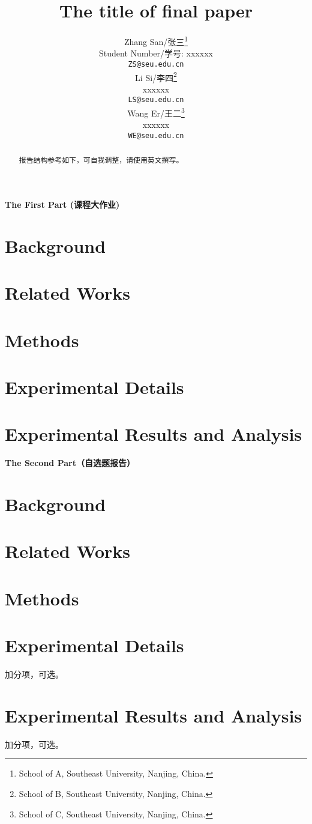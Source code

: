 \documentclass{article}
\title{The title of final paper}
\author{%
  Zhang San/张三\thanks{School of A, Southeast University, Nanjing, China.}\\
  Student Number/学号: xxxxxx \\
  \texttt{ZS@seu.edu.cn} \\
  \And
  Li Si/李四\thanks{School of B, Southeast University, Nanjing, China.} \\
  xxxxxx \\
  \texttt{LS@seu.edu.cn} \\
  \And
  Wang Er/王二\thanks{School of C, Southeast University, Nanjing, China.} \\
  xxxxxx \\
  \texttt{WE@seu.edu.cn} \\
}
\begin{document}
\maketitle

\begin{abstract}
  报告结构参考如下，可自我调整，请使用英文撰写。
\end{abstract}


\begin{center}
\Large\textbf{The First Part (课程大作业)}
\end{center}

\section{Background}

\section{Related Works}

\section{Methods}

\section{Experimental Details}

\section{Experimental Results and Analysis}

\newpage
\begin{center}
\Large\textbf{The Second Part（自选题报告）}
\end{center}

\setcounter{section}{0}\section{Background}

\section{Related Works}

\section{Methods}

\section{Experimental Details}
加分项，可选。

\section{Experimental Results and Analysis}
加分项，可选。
\end{document}
